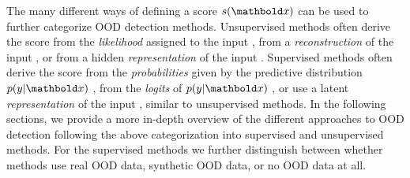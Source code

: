 The many different ways of defining a score $s(\xb)$ can be used to further categorize OOD detection methods.
Unsupervised methods often derive the score 
from the \emph{likelihood} assigned to the input \cite{bishop_novelty_1994,choi_waic_2019,kirichenko_why_2020,ren_likelihood_2019,serra_input_2020,xiao_likelihood_2020,morningstar_density_2021,nalisnick_detecting_2019,bergamin_modelagnostic_2022,maaloe_biva_2019,havtorn_hierarchical_2021}, 
from a \emph{reconstruction} of the input \cite{sakurada_anomaly_2014,xia_learning_2015,lyudchik_outlier_2016,zhou_anomaly_2017,chen_outlier_2017,schlegl_unsupervised_2017,zong_deep_2018,li_madgan_2019,graham_denoising_2023,liu_unsupervised_2023a}, or 
from a hidden \emph{representation} of the input \cite{denouden_improving_2018,hendrycks_using_2019,ahmadian_likelihoodfree_2021,bergman_classificationbased_2020,tack_csi_2020,sehwag_ssd_2021,xiao_we_2021}.  %
Supervised methods often derive the score 
from the \emph{probabilities} given by the predictive distribution $p(y|\xb)$ \cite{hendrycks_baseline_2017,hendrycks_scaling_2022}, 
from the \emph{logits} of $p(y|\xb)$ \cite{hendrycks_scaling_2022,liu_energy-based_2020}, or 
use a latent \emph{representation} of the input \cite{lee_simple_2018,li_anomaly_2019,ndiour_outofdistribution_2020,cook_outlier_2020,zaeemzadeh_outofdistribution_2021}, similar to unsupervised methods. 
In the following sections, we provide a more in-depth overview of the different approaches to OOD detection following the above categorization into supervised and unsupervised methods. For the supervised methods we further distinguish between whether methods use real OOD data, synthetic OOD data, or no OOD data at all. 

